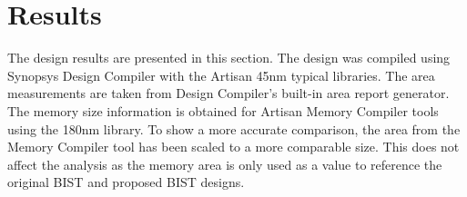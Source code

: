 \chapter{Results}
\label{chap:results}
The design results are presented in this section.  The design was compiled using Synopsys Design Compiler with the Artisan 45nm typical libraries.  The area measurements are taken from Design Compiler's built-in area report generator.  The memory size information is obtained for Artisan Memory Compiler tools using the 180nm library.  To show a more accurate comparison, the area from the Memory Compiler tool has been scaled to a more comparable size.  This does not affect the analysis as the memory area is only used as a value to reference the original BIST and proposed BIST designs.  




